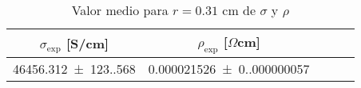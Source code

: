 \begin{table}[H]
    \centering
\begin{tabular}{ccccc}
\toprule
$\sigma_{\exp}$ [S/cm] & $\rho_{\exp}$ [$\Omega$cm] \\
\midrule
\num{46456.312(123.568)} & \num{0.000021526(0.000000057)} \\
\bottomrule
\end{tabular}
    \caption{Valor medio para $r=0.31$ cm de $\sigma$ y $\rho $}
    \label{Tab:S3}
\end{table}
